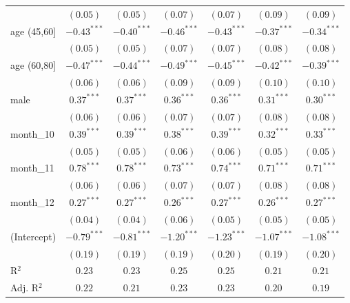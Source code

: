 \begin{table}[h!]
\begin{center}
\begin{small}
\begin{tabular}{l c c c c c c}
               & $(0.05)$      & $(0.05)$      & $(0.07)$      & $(0.07)$      & $(0.09)$      & $(0.09)$      \\
age (45,60]    & $-0.43^{***}$ & $-0.40^{***}$ & $-0.46^{***}$ & $-0.43^{***}$ & $-0.37^{***}$ & $-0.34^{***}$ \\
               & $(0.05)$      & $(0.05)$      & $(0.07)$      & $(0.07)$      & $(0.08)$      & $(0.08)$      \\
age (60,80]    & $-0.47^{***}$ & $-0.44^{***}$ & $-0.49^{***}$ & $-0.45^{***}$ & $-0.42^{***}$ & $-0.39^{***}$ \\
               & $(0.06)$      & $(0.06)$      & $(0.09)$      & $(0.09)$      & $(0.10)$      & $(0.10)$      \\
male           & $0.37^{***}$  & $0.37^{***}$  & $0.36^{***}$  & $0.36^{***}$  & $0.31^{***}$  & $0.30^{***}$  \\
               & $(0.06)$      & $(0.06)$      & $(0.07)$      & $(0.07)$      & $(0.08)$      & $(0.08)$      \\
month\_10      & $0.39^{***}$  & $0.39^{***}$  & $0.38^{***}$  & $0.39^{***}$  & $0.32^{***}$  & $0.33^{***}$  \\
               & $(0.05)$      & $(0.05)$      & $(0.06)$      & $(0.06)$      & $(0.05)$      & $(0.05)$      \\
month\_11      & $0.78^{***}$  & $0.78^{***}$  & $0.73^{***}$  & $0.74^{***}$  & $0.71^{***}$  & $0.71^{***}$  \\
               & $(0.06)$      & $(0.06)$      & $(0.07)$      & $(0.07)$      & $(0.08)$      & $(0.08)$      \\
month\_12      & $0.27^{***}$  & $0.27^{***}$  & $0.26^{***}$  & $0.27^{***}$  & $0.26^{***}$  & $0.27^{***}$  \\
               & $(0.04)$      & $(0.04)$      & $(0.06)$      & $(0.05)$      & $(0.05)$      & $(0.05)$      \\
(Intercept)    & $-0.79^{***}$ & $-0.81^{***}$ & $-1.20^{***}$ & $-1.23^{***}$ & $-1.07^{***}$ & $-1.08^{***}$ \\
               & $(0.19)$      & $(0.19)$      & $(0.19)$      & $(0.20)$      & $(0.19)$      & $(0.20)$      \\
\hline
R$^2$          & $0.23$        & $0.23$        & $0.25$        & $0.25$        & $0.21$        & $0.21$        \\
Adj. R$^2$     & $0.22$        & $0.21$        & $0.23$        & $0.23$        & $0.20$        & $0.19$        \\

\end{tabular}
\end{small}
\end{center}
\end{table}
